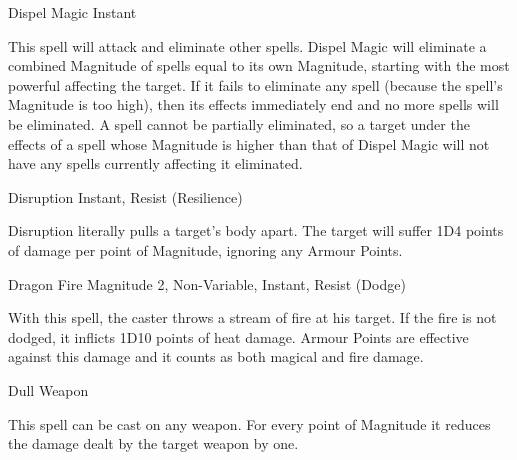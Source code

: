 \begin{rpg-spell}
{Dispel Magic}
{Instant}

This spell will attack and eliminate other spells. Dispel Magic will eliminate a combined Magnitude of spells equal to its own Magnitude, starting with the most powerful affecting the target. If it fails to eliminate any spell (because the spell’s Magnitude is too high), then its effects immediately end and no more spells will be eliminated. A spell cannot be partially eliminated, so a target under the effects of a spell whose Magnitude is higher than that of Dispel Magic will not have any spells currently affecting it eliminated. 
\end{rpg-spell}


\begin{rpg-spell}
{Disruption}
{Instant, Resist (Resilience)}

Disruption literally pulls a target’s body apart. The target will suffer 1D4 points of damage per point of Magnitude, ignoring any Armour Points. 
\end{rpg-spell}


\begin{rpg-spell}
{Dragon Fire}
{Magnitude 2, Non-Variable, Instant, Resist (Dodge)}

With this spell, the caster throws a stream of fire at his target. If the fire is not dodged, it inflicts 1D10 points of heat damage. Armour Points are effective against this damage and it counts as both magical and fire damage.
\end{rpg-spell}


\begin{rpg-spell}
{Dull Weapon}
{}

This spell can be cast on any weapon. For every point of Magnitude it reduces the damage dealt by the target weapon by one. 
\end{rpg-spell}


